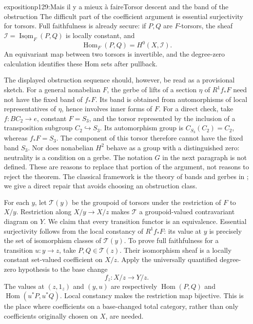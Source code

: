 \begin{dcomment}{exposition}{p129:Mais il y a mieux à faire}{Torsor descent and the band of the obstruction}
The difficult part of the coefficient argument is essential surjectivity for torsors. Full faithfulness is already secure: if \(P,Q\) are \(F\)-torsors, the sheaf \(\mathcal I=\underline{\operatorname{Isom}}_F(P,Q)\) is locally constant, and
\[
 \operatorname{Hom}_F(P,Q)=H^0(X,\mathcal I).
\]
An equivariant map between two torsors is invertible, and the degree-zero calculation identifies these Hom sets after pullback.

The displayed obstruction sequence should, however, be read as a provisional sketch. For a general nonabelian \(F\), the gerbe of lifts of a section \(\eta\) of \(R^1f_*F\) need not have the fixed band of \(f_*F\). Its band is obtained from automorphisms of local representatives of \(\eta\), hence involves inner forms of \(F\). For a direct check, take \(f:BC_2\to e\), constant \(F=S_3\), and the torsor represented by the inclusion of a transposition subgroup \(C_2\hookrightarrow S_3\). Its automorphism group is \(C_{S_3}(C_2)=C_2\), whereas \(f_*F=S_3\). The component of this torsor therefore cannot have the fixed band \(S_3\). Nor does nonabelian \(H^2\) behave as a group with a distinguished zero: neutrality is a condition on a gerbe. The notation \(G\) in the next paragraph is not defined. These are reasons to replace that portion of the argument, not reasons to reject the theorem. The classical framework is the theory of bands and gerbes in \citet[Chapter IV]{Giraud1971}; we give a direct repair that avoids choosing an obstruction class.

For each \(y\), let \(\mathcal T(y)\) be the groupoid of torsors under the restriction of \(F\) to \(X/y\). Restriction along \(X/y\longrightarrow X/z\) makes \(\mathcal T\) a groupoid-valued contravariant diagram on \(Y\). We claim that every transition functor is an equivalence. Essential surjectivity follows from the local constancy of \(R^1f_*F\): its value at \(y\) is precisely the set of isomorphism classes of \(\mathcal T(y)\). To prove full faithfulness for a transition \(u:y\longrightarrow z\), take \(P,Q\in\mathcal T(z)\). Their isomorphism sheaf is a locally constant set-valued coefficient on \(X/z\). Apply the universally quantified degree-zero hypothesis to the base change
\[
 f_z:X/z\longrightarrow Y/z.
\]
The values at \((z,1_z)\) and \((y,u)\) are respectively
\(\operatorname{Hom}(P,Q)\) and
\(\operatorname{Hom}(u^*P,u^*Q)\).
Local constancy makes the restriction map bijective. This is the place where coefficients on a base-changed total category, rather than only coefficients originally chosen on \(X\), are needed.


\end{dcomment}
